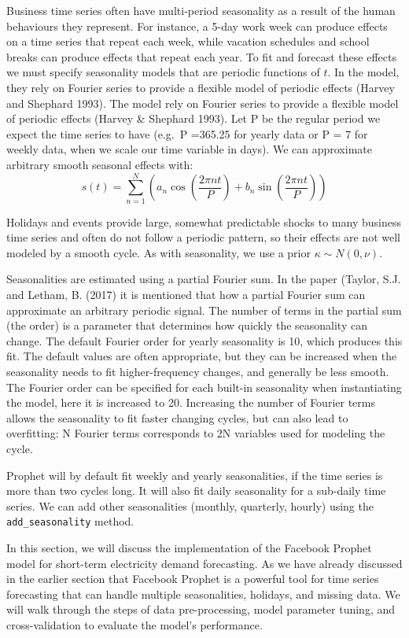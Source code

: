 \documentclass[mstat,12pt]{unswthesis}
\begin{document}
Business time series often have multi-period seasonality as a result of
the human behaviours they represent. For instance, a 5-day work week can
produce effects on a time series that repeat each week, while vacation
schedules and school breaks can produce effects that repeat each year.
To fit and forecast these effects we must specify seasonality models
that are periodic functions of \(t\). In the model, they rely on Fourier
series to provide a flexible model of periodic effects (Harvey and
Shephard 1993). The model rely on Fourier series to provide a flexible
model of periodic effects (Harvey \& Shephard 1993). Let P be the
regular period we expect the time series to have (e.g.~P =365.25 for
yearly data or P = 7 for weekly data, when we scale our time variable in
days). We can approximate arbitrary smooth seasonal effects with: \[
s(t) = \sum_{n=1}^{N} (a_n \cos(\frac{2\pi nt}{P}) + b_n \sin(\frac{2\pi nt}{P}))
\]

Holidays and events provide large, somewhat predictable shocks to many
business time series and often do not follow a periodic pattern, so
their effects are not well modeled by a smooth cycle. As with
seasonality, we use a prior \(\kappa \sim {N(0,\nu)}\).

Seasonalities are estimated using a partial Fourier sum. In the paper
(Taylor, S.J. and Letham, B. (2017) it is mentioned that how a partial
Fourier sum can approximate an arbitrary periodic signal. The number of
terms in the partial sum (the order) is a parameter that determines how
quickly the seasonality can change. The default Fourier order for yearly
seasonality is 10, which produces this fit. The default values are often
appropriate, but they can be increased when the seasonality needs to fit
higher-frequency changes, and generally be less smooth. The Fourier
order can be specified for each built-in seasonality when instantiating
the model, here it is increased to 20. Increasing the number of Fourier
terms allows the seasonality to fit faster changing cycles, but can also
lead to overfitting: N Fourier terms corresponds to 2N variables used
for modeling the cycle.

Prophet will by default fit weekly and yearly seasonalities, if the time
series is more than two cycles long. It will also fit daily seasonality
for a sub-daily time series. We can add other seasonalities (monthly,
quarterly, hourly) using the \texttt{add\_seasonality} method.

In this section, we will discuss the implementation of the Facebook
Prophet model for short-term electricity demand forecasting. As we have
already discussed in the earlier section that Facebook Prophet is a
powerful tool for time series forecasting that can handle multiple
seasonalities, holidays, and missing data. We will walk through the
steps of data pre-processing, model parameter tuning, and
cross-validation to evaluate the model's performance.
\end{document}
